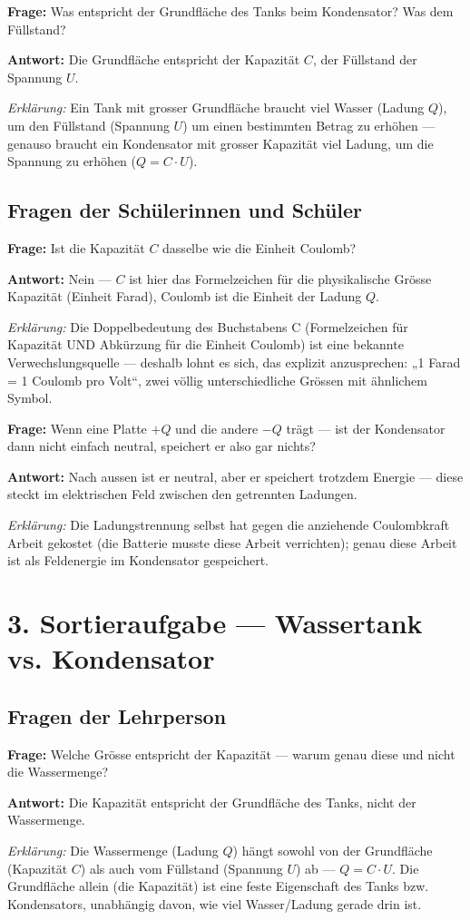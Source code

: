 \documentclass[11pt,a4paper]{article}
\newcommand{\Frage}[1]{\textbf{Frage:} #1\par}
\newcommand{\Antwort}[1]{\textbf{Antwort:} #1\par}
\newcommand{\Erklaerung}[1]{\textit{Erklärung:} #1}
\newcommand{\FrageBlock}[3]{\Frage{#1}\Antwort{#2}\Erklaerung{#3}\vspace{0.6em}}
\begin{document}
\FrageBlock{Was entspricht der Grundfläche des Tanks beim Kondensator? Was dem Füllstand?}
{Die Grundfläche entspricht der Kapazität $C$, der Füllstand der Spannung $U$.}
{Ein Tank mit grosser Grundfläche braucht viel Wasser (Ladung $Q$), um den Füllstand (Spannung $U$) um einen bestimmten Betrag zu erhöhen --- genauso braucht ein Kondensator mit grosser Kapazität viel Ladung, um die Spannung zu erhöhen ($Q=C\cdot U$).}

\subsection*{Fragen der Schülerinnen und Schüler}

\FrageBlock{Ist die Kapazität $C$ dasselbe wie die Einheit Coulomb?}
{Nein --- $C$ ist hier das Formelzeichen für die physikalische Grösse Kapazität (Einheit Farad), Coulomb ist die Einheit der Ladung $Q$.}
{Die Doppelbedeutung des Buchstabens C (Formelzeichen für Kapazität UND Abkürzung für die Einheit Coulomb) ist eine bekannte Verwechslungsquelle --- deshalb lohnt es sich, das explizit anzusprechen: „1 Farad = 1 Coulomb pro Volt“, zwei völlig unterschiedliche Grössen mit ähnlichem Symbol.}

\FrageBlock{Wenn eine Platte $+Q$ und die andere $-Q$ trägt --- ist der Kondensator dann nicht einfach neutral, speichert er also gar nichts?}
{Nach aussen ist er neutral, aber er speichert trotzdem Energie --- diese steckt im elektrischen Feld zwischen den getrennten Ladungen.}
{Die Ladungstrennung selbst hat gegen die anziehende Coulombkraft Arbeit gekostet (die Batterie musste diese Arbeit verrichten); genau diese Arbeit ist als Feldenergie im Kondensator gespeichert.}

\section*{3. Sortieraufgabe --- Wassertank vs. Kondensator}

\subsection*{Fragen der Lehrperson}

\FrageBlock{Welche Grösse entspricht der Kapazität --- warum genau diese und nicht die Wassermenge?}
{Die Kapazität entspricht der Grundfläche des Tanks, nicht der Wassermenge.}
{Die Wassermenge (Ladung $Q$) hängt sowohl von der Grundfläche (Kapazität $C$) als auch vom Füllstand (Spannung $U$) ab --- $Q=C\cdot U$. Die Grundfläche allein (die Kapazität) ist eine feste Eigenschaft des Tanks bzw. Kondensators, unabhängig davon, wie viel Wasser/Ladung gerade drin ist.}
\end{document}
